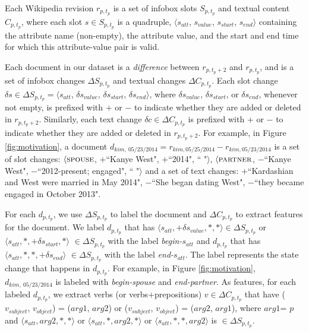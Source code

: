 Each Wikipedia revision $r_{p, t_p}$ is a set of infobox slots $S_{p, t_p}$ and textual content $C_{p, t_p}$, where each slot $s \in S_{p, t_p}$ is a quadruple, $\langle s_{att}$, $s_{value}$,  $s_{start}$, $s_{end} \rangle$ containing the attribute name (non-empty), the attribute value, and the start and end time for which this attribute-value pair is valid. 

Each document in our dataset is a \textit{difference} between $r_{p, t_p+2}$ and $r_{p, t_p}$, and is a set of infobox changes $\Delta S_{p, t_p}$ and textual changes $\Delta C_{p, t_p}$. Each slot change $\delta s \in \Delta S_{p, t_p} = \langle s_{att}$, $\delta s_{value}$,  $\delta s_{start}$, $\delta s_{end} \rangle$, where $\delta s_{value}$,  $\delta s_{start}$, or $\delta s_{end}$, whenever not empty, is prefixed with $+$ or $-$ to indicate whether they are added or deleted in $r_{p, t_p+2}$. Similarly, each text change $\delta c \in \Delta C_{p, t_p}$ is prefixed with $+$ or $-$ to indicate whether they are added or deleted in $r_{p, t_p+2}$. For example, in Figure \ref{fig:motivation}, a document $d_{kim,\ 05/23/2014} = r_{kim, 05/25/2014} - r_{kim, 05/23/2014}$ is a set of slot changes: $\langle\textsc{spouse}$, \textbf{$+$}\footnotesize ``Kanye West"\normalsize,  $+$\footnotesize ``2014"\normalsize, \footnotesize`` "\normalsize$\rangle$, $\langle\textsc{partner}$, $-$\footnotesize``Kanye West"\normalsize,  $-$\footnotesize``2012-present; engaged"\normalsize, \footnotesize`` "\normalsize$\rangle$ and a set of text changes: $+$\footnotesize``Kardashian and West were married in May 2014"\normalsize, $-$\footnotesize``She began dating West"\normalsize, $-$\footnotesize``they became engaged in October 2013"\normalsize.

For each $d_{p, t_p}$, we use $\Delta S_{p, t_p}$ to label the document and $\Delta C_{p, t_p}$ to extract features for the document. We label $d_{p, t_p}$ that has $\langle s_{att}, +\delta s_{value}, *, *\rangle \in \Delta S_{p, t_p}$ or $\langle s_{att}, *, +\delta s_{start}, *\rangle$ $\in \Delta S_{p, t_p}$ with the label \textit{begin-}$s_{att}$ and $d_{p, t_p}$ that has $\langle s_{att}, *, *, +\delta s_{end}\rangle$ $\in \Delta S_{p, t_p}$ with the label \textit{end-}$s_{att}$. The label represents the state change that happens in $d_{p, t_p}$. For example, in Figure \ref{fig:motivation}, $d_{kim,\ 05/23/2014}$ is labeled with \textit{begin-spouse} and \textit{end-partner}. As features, for each labeled $d_{p,t_p}$, we extract verbs (or verbs+prepositions) $v \in \Delta C_{p, t_p}$ that have ($v_{subject}$, $v_{object}$) = (\scriptsize$arg1$\normalsize, \scriptsize$arg2$\normalsize) or ($v_{subject}$, $v_{object}$) = (\scriptsize$arg2$\normalsize,  \scriptsize$arg1$\normalsize), where \scriptsize$arg1$\normalsize = $p$ and $\langle s_{att}, $\scriptsize$arg2$\normalsize$, *, *\rangle$ or $\langle s_{att}, *, $\scriptsize$arg2$\normalsize$, *\rangle$ or $\langle s_{att}, *, *, $\scriptsize$arg2$\normalsize$\rangle$ is $\in \Delta S_{p, t_p}$.

